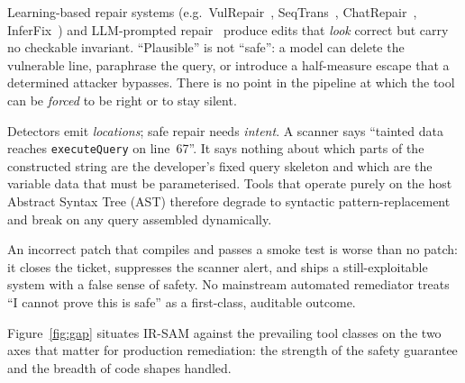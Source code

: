 \documentclass[11pt,a4paper]{article}
\newcommand{\irsam}{\mbox{IR\nobreakdash-SAM}}
\begin{document}
\begin{description}[leftmargin=1.4em,style=nextline]
  \item[G1 --- No soundness contract.]
  Learning-based repair systems
  (e.g.\ VulRepair~\cite{fu2022vulrepair}, SeqTrans~\cite{chi2023seqtrans},
  ChatRepair~\cite{xia2023chatrepair}, InferFix~\cite{jin2023inferfix})
  and LLM-prompted repair~\cite{pearce2023examining} produce edits that
  \emph{look} correct but carry no checkable invariant. ``Plausible'' is
  not ``safe'': a model can delete the vulnerable line, paraphrase the
  query, or introduce a half-measure escape that a determined attacker
  bypasses. There is no point in the pipeline at which the tool can be
  \emph{forced} to be right or to stay silent.

  \item[G2 --- Detector--repairer impedance mismatch.]
  Detectors emit \emph{locations}; safe repair needs \emph{intent}. A
  scanner says ``tainted data reaches \texttt{executeQuery} on line~67''.
  It says nothing about which parts of the constructed string are the
  developer's fixed query skeleton and which are the variable data that
  must be parameterised. Tools that operate purely on the host
  Abstract Syntax Tree (AST) therefore degrade to syntactic
  pattern-replacement and break on any query assembled dynamically.

  \item[G3 --- The false-fix failure mode.]
  An incorrect patch that compiles and passes a smoke test is worse than
  no patch: it closes the ticket, suppresses the scanner alert, and ships
  a still-exploitable system with a false sense of safety. No mainstream
  automated remediator treats ``I cannot prove this is safe'' as a
  first-class, auditable outcome.
\end{description}

Figure~\ref{fig:gap} situates \irsam{} against the prevailing tool
classes on the two axes that matter for production remediation:
the strength of the safety guarantee and the breadth of code shapes
handled.
\end{document}
